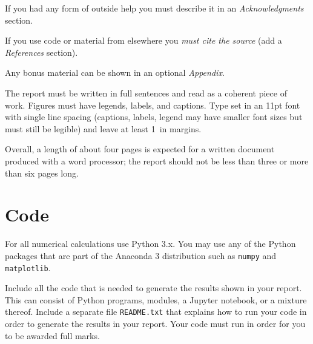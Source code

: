 \documentclass[letterpaper]{scrartcl}
\begin{document}
If you had any form of outside help you must describe it in an
\emph{Acknowledgments} section. 

If you use code or material from elsewhere you \emph{must cite the
  source} (add a \emph{References} section). 

Any bonus material can be shown in an optional \emph{Appendix}.

The report must be written in full sentences and read as a coherent
piece of work. Figures must have legends, labels, and captions. Type
set in an 11pt font with single line spacing (captions, labels, legend
may have smaller font sizes but must still be legible) and leave at
least 1~in margins. 

Overall, a length of about four pages is expected for a written
document produced with a word processor; the report should
not be less than three or more than six pages long.

\section{Code}
\label{sec:code}

For all numerical calculations use Python 3.x. You may use any of the
Python packages that are part of the Anaconda 3 distribution such as
\texttt{numpy} and \texttt{matplotlib}. 

Include all the code that is needed to generate the results shown in
your report. This can consist of Python programs, modules, a Jupyter
notebook, or a mixture thereof. Include a separate file
\texttt{README.txt} that explains how to run your code in order to
generate the results in your report. Your code must run in order for
you to be awarded full marks.
\end{document}
